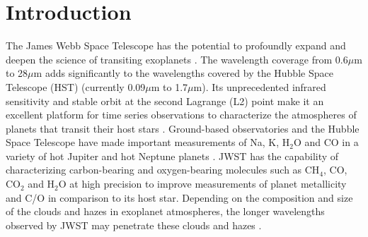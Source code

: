 \documentclass[iop]{emulateapj}
\begin{document}



\section{Introduction}

The James Webb Space Telescope \citep[JWST; e.g.][]{gardner2006SSRv} has the potential to profoundly expand and deepen the science of transiting exoplanets \citep[e.g.][]{greene2016jwst_trans}.
The wavelength coverage from 0.6$\mu$m to 28$\mu$m adds significantly to the wavelengths covered by the Hubble Space Telescope (HST) (currently 0.09$\mu$m to 1.7$\mu$m).
Its unprecedented infrared sensitivity and stable orbit at the second Lagrange (L2) point make it an excellent platform for time series observations to characterize the atmospheres of planets that transit their host stars \citep{beichman2014pasp,stevenson2016ers}.
Ground-based observatories and the Hubble Space Telescope have made important measurements of Na, K, H$_2$O and CO in a variety of hot Jupiter and hot Neptune planets \cite[e.g.][]{charbNa,redfield2008sodium,snellen2008Na209,brogi2012tauB,rodler2012taub,birkby2013water,kreidberg2014wasp43,fraine2014hatp11,deming13,sing2016continuum}.
JWST has the capability of characterizing carbon-bearing and oxygen-bearing molecules such as CH$_4$, CO, CO$_2$ and H$_2$O at high precision to improve measurements of planet metallicity and C/O in comparison to its host star.
Depending on the composition and size of the clouds and hazes in exoplanet atmospheres, the longer wavelengths observed by JWST may penetrate these clouds and hazes \citep[e.g.][]{morley2015superEclouds}.
\end{document}
